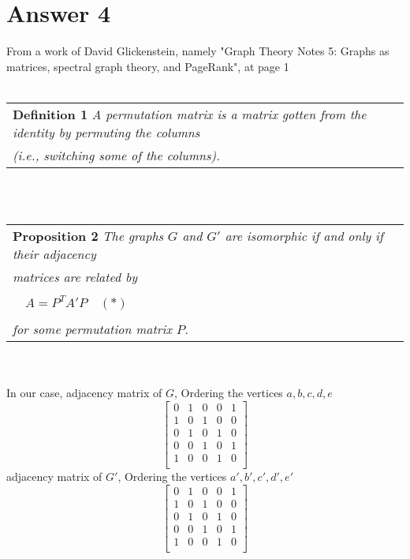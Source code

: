\documentclass[11pt]{article}
\begin{document}
\section*{Answer 4}
From a work of David Glickenstein, namely "Graph Theory Notes 5: Graphs as matrices, 
spectral graph theory, and PageRank", at page 1 \label{work}
\\ \\
\begin{tabular}{l}
    \textbf{Definition 1 }\textit{A permutation matrix is a matrix gotten from the identity by permuting the columns } \\
    \textit{(i.e., switching some of the columns).}   
\end{tabular}
\\ \\
\begin{tabular}{l}
    \textbf{Proposition 2 }\textit{The graphs $G$ and $G'$ are isomorphic if and only if their adjacency} \\
    \textit{matrices are related by} \\
    \\
    $\quad A=P^TA'P \quad (*)$\\
    \\
    \textit{for some permutation matrix $P$.}
\end{tabular}
\\ \\
In our case, adjacency matrix of $G$, Ordering the vertices $a,b,c,d,e$
\begin{equation}
    \begin{bmatrix}
        0 & 1 & 0 & 0 & 1 \\
        1 & 0 & 1 & 0 & 0 \\
        0 & 1 & 0 & 1 & 0 \\
        0 & 0 & 1 & 0 & 1 \\
        1 & 0 & 0 & 1 & 0 \\ 
    \end{bmatrix}
\end{equation}
adjacency matrix of $G'$, Ordering the vertices $a',b',c',d',e'$
\begin{equation}
    \begin{bmatrix}
        0 & 1 & 0 & 0 & 1 \\
        1 & 0 & 1 & 0 & 0 \\
        0 & 1 & 0 & 1 & 0 \\
        0 & 0 & 1 & 0 & 1 \\
        1 & 0 & 0 & 1 & 0 \\ 
    \end{bmatrix}
\end{equation}
\end{document}
